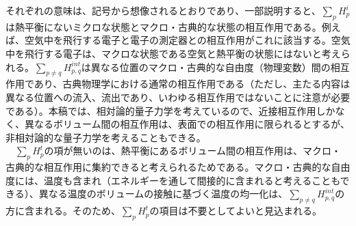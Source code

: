 それぞれの意味は、記号から想像されるとおりであり、一部説明すると、$\sum_p H_p^i$は熱平衡にないミクロな状態とマクロ・古典的な状態の相互作用である。例えば、空気中を飛行する電子と電子の測定器との相互作用がこれに該当する。空気中を飛行する電子は、マクロな状態である空気と熱平衡の状態にはないと考えられる。$\sum_{p \neq q}H^{int}_{p,q}$は異なる位置のマクロ・古典的な自由度（物理変数）間の相互作用であり、古典物理学における通常の相互作用である（ただし、主たる内容は異なる位置への流入、流出であり、いわゆる相互作用ではないことに注意が必要である）。本稿では、相対論的量子力学を考えているので、近接相互作用しかなく、異なるボリューム間の相互作用は、表面での相互作用に限られるとするが、非相対論的な量子力学を考えることもできる。\\
　$\sum_p H_p^t$の項が無いのは、熱平衡にあるボリューム間の相互作用は、マクロ・古典的な相互作用に集約できると考えられるためである。マクロ・古典的な自由度には、温度も含まれ（エネルギーを通して間接的に含まれると考えることもできる）、異なる温度のボリュームの接触に基づく温度の均一化は、$\sum_{p \neq q} H^{int}_{p,q}$の方に含まれる。そのため、$\sum_pH_p^t$の項目は不要としてよいと見込まれる。